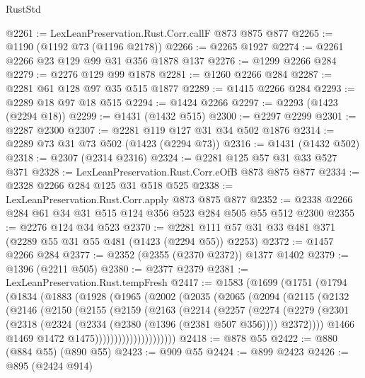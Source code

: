 \begin{lexlean}{RustStd}
\begin{coremodule}
@2261 := LexLeanPreservation.Rust.Corr.callF @873 @875 @877
@2265 := @1190 (@1192 @73 (@1196 @2178))
@2266 := @2265 @1927
@2274 := @2261 @2266 @23 @129 @99 @31 @356 @1878 @137
@2276 := @1299 @2266 @284
@2279 := @2276 @129 @99 @1878
@2281 := @1260 @2266 @284
@2287 := @2281 @61 @128 @97 @35 @515 @1877
@2289 := @1415 @2266 @284
@2293 := @2289 @18 @97 @18 @515
@2294 := @1424 @2266
@2297 := @2293 (@1423 (@2294 @18))
@2299 := @1431 (@1432 @515)
@2300 := @2297 @2299
@2301 := @2287 @2300
@2307 := @2281 @119 @127 @31 @34 @502 @1876
@2314 := @2289 @73 @31 @73 @502 (@1423 (@2294 @73))
@2316 := @1431 (@1432 @502)
@2318 := @2307 (@2314 @2316)
@2324 := @2281 @125 @57 @31 @33 @527 @371
@2328 := LexLeanPreservation.Rust.Corr.eOfB @873 @875 @877
@2334 := @2328 @2266 @284 @125 @31 @518 @525
@2338 := LexLeanPreservation.Rust.Corr.apply @873 @875 @877
@2352 := @2338 @2266 @284 @61 @34 @31 @515 @124 @356 @523 @284 @505 @55 @512 @2300
@2355 := @2276 @124 @34 @523
@2370 := @2281 @111 @57 @31 @33 @481 @371 (@2289 @55 @31 @55 @481 (@1423 (@2294 @55)) @2253)
@2372 := @1457 @2266 @284
@2377 := @2352 (@2355 (@2370 @2372)) @1377 @1402
@2379 := @1396 (@2211 @505)
@2380 := @2377 @2379
@2381 := LexLeanPreservation.Rust.tempFresh
@2417 := @1583
    (@1699
      (@1751
        (@1794
          (@1834
            (@1883
              (@1928
                (@1965
                  (@2002
                    (@2035
                      (@2065
                        (@2094
                          (@2115
                            (@2132
                              (@2146
                                (@2150
                                  (@2155
                                    (@2159
                                      (@2163
                                        (@2214
                                          (@2257
                                            (@2274
                                              (@2279
                                                (@2301
                                                  (@2318
                                                    (@2324
                                                      (@2334 (@2380 (@1396 (@2381 @507 @356))))
                                                      @2372))))
                                              @1466
                                              @1469
                                              @1472
                                              @1475)))))))))))))))))))))
@2418 := @878 @55
@2422 := @880 (@884 @55) (@890 @55)
@2423 := @909 @55
@2424 := @899 @2423
@2426 := @895 (@2424 @914)

\end{coremodule}
\end{lexlean}
